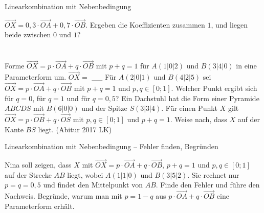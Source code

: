 \setcounter{aufgabe}{7}

\begin{aufgabe}{Linearkombination mit Nebenbedingung}
\begin{teile}
\teil $\vec{OX} = 0{,}3 \cdot \vec{OA} + 0{,}7 \cdot \vec{OB}$. Ergeben die Koeffizienten zusammen $1$, und liegen beide zwischen $0$ und $1$? \\  \\  \\ 
\teil Forme $\vec{OX} = p \cdot \vec{OA} + q \cdot \vec{OB}$ mit $p + q = 1$ für $A(1 | 0 | 2)$ und $B(3 | 4 | 0)$ in eine Parameterform um. $\vec{OX} =$ \_\_
\teil Für $A(2 | 0 | 1)$ und $B(4 | 2 | 5)$ sei $\vec{OX} = p \cdot \vec{OA} + q \cdot \vec{OB}$ mit $p + q = 1$ und $p, q \in [0; 1]$. Welcher Punkt ergibt sich für $q = 0$, für $q = 1$ und für $q = 0{,}5$?
\teil Ein Dachstuhl hat die Form einer Pyramide $ABCDS$ mit $B(6 | 0 | 0)$ und der Spitze $S(3 | 3 | 4)$. Für einen Punkt $X$ gilt $\vec{OX} = p \cdot \vec{OB} + q \cdot \vec{OS}$ mit $p, q \in [0; 1]$ und $p + q = 1$. Weise nach, dass $X$ auf der Kante $BS$ liegt. \hfill (Abitur 2017 LK)
\end{teile}
\end{aufgabe}

\begin{aufgabe}{Linearkombination mit Nebenbedingung – Fehler finden, Begründen}
\begin{teile}
\teil Nina soll zeigen, dass $X$ mit $\vec{OX} = p \cdot \vec{OA} + q \cdot \vec{OB}$, $p + q = 1$ und $p, q \in [0; 1]$ auf der Strecke $AB$ liegt, wobei $A(1 | 1 | 0)$ und $B(3 | 5 | 2)$. Sie rechnet nur $p = q = 0{,}5$ und findet den Mittelpunkt von $AB$. Finde den Fehler und führe den Nachweis.
\teil Begründe, warum man mit $p = 1 - q$ aus $p \cdot \vec{OA} + q \cdot \vec{OB}$ eine Parameterform erhält.
\end{teile}
\end{aufgabe}

